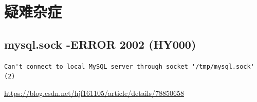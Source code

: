 \documentclass[UTF8,a4paper,12pt]{ctexbook}
\begin{document}
\chapter{疑难杂症}
	\section{mysql.sock -ERROR 2002 (HY000)}
		
		\verb|Can't connect to local MySQL server through socket '/tmp/mysql.sock' (2)|
		
		\url{https://blog.csdn.net/hjf161105/article/details/78850658}
		    
\end{document}
